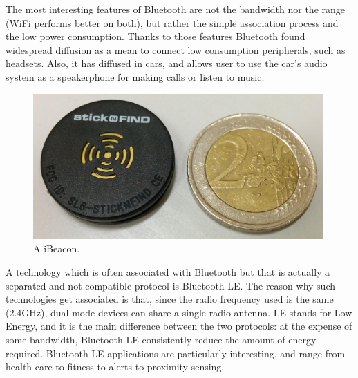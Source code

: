 \documentclass[12pt,a4paper,twoside,openright]{book}
\begin{document}
The most interesting features of Bluetooth are not the bandwidth nor the range (WiFi performs better on both), but rather the simple association process and the low power consumption.
%
Thanks to those features Bluetooth found widespread diffusion as a mean to connect low consumption peripherals, such as headsets.
%
Also, it has diffused in cars, and allows user to use the car's audio system as a speakerphone for making calls or listen to music.

\begin{figure}
	\centering
	\includegraphics[width=0.99\textwidth]{img/ibeacon}
	\caption[iBeacon]{
		A iBeacon.
	}
	\label{img:ibeacon}
\end{figure}

A technology which is often associated with Bluetooth but that is actually a separated and not compatible protocol is Bluetooth LE.
%
The reason why such technologies get associated is that, since the radio frequency used is the same (2.4GHz), dual mode devices can share a single radio antenna.
%
LE stands for Low Energy, and it is the main difference between the two protocols: at the expense of some bandwidth, Bluetooth LE consistently reduce the amount of energy required.
%
Bluetooth LE applications are particularly interesting, and range from health care to fitness to alerts to proximity sensing.
\end{document}
